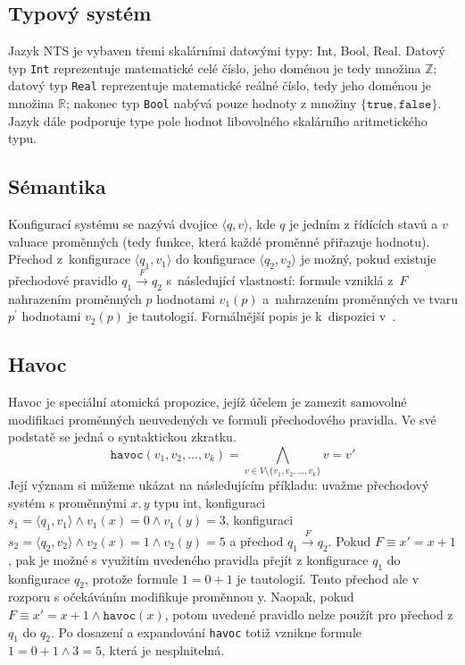 \documentclass[10pt,a4paper,notitlepage]{report}
\newcommand{\tuple}[1]{\langle #1 \rangle}
\begin{document}
\subsection{Typový systém}
Jazyk NTS je vybaven třemi skalárními datovými typy: Int, Bool, Real. Datový typ \texttt{Int} reprezentuje matematické celé číslo, jeho doménou je tedy množina $\mathbb{Z}$; datový typ \texttt{Real} reprezentuje matematické reálné číslo, tedy jeho doménou je množina $\mathbb{R}$; nakonec typ \texttt{Bool} nabývá pouze hodnoty z množiny $\{ \texttt{true}, \texttt{false} \}$. Jazyk dále podporuje type pole hodnot libovolného skalárního aritmetického typu.

\subsection{Sémantika}
\label{subsec:nts-configuration}
Konfigurací systému se nazývá dvojice $\tuple{q, v}$, kde $q$ je jedním z řídících stavů a $v$ valuace proměnných (tedy funkce, která každé proměnné přiřazuje hodnotu). Přechod z~konfigurace $\tuple{q_1, v_1}$ do konfigurace $\tuple{q_2, v_2}$ je možný, pokud existuje přechodové pravidlo $q_1 \overset{F}{\rightarrow} q_2$ s~následující vlastností: formule vzniklá z~$F$ nahrazením proměnných $p$ hodnotami $v_1(p)$ a~nahrazením proměnných ve tvaru $p^\prime$ hodnotami $v_2(p)$ je tautologií. Formálnější popis je k~dispozici v~\cite{NTSref}.

\subsection{Havoc}
\label{subsec:nts-havoc}
Havoc je speciální atomická propozice, jejíž účelem je zamezit samovolné modifikaci proměnných neuvedených ve formuli přechodového pravidla. Ve své podstatě se jedná o syntaktickou zkratku.
\begin{equation}
\texttt{havoc} \left( v_1, v_2, \ldots, v_k \right) = \bigwedge_{v \in V \setminus \{ v_1, v_2, \ldots, v_k \}} v = v\prime
\end{equation}
Její význam si můžeme ukázat na následujícím příkladu: uvažme přechodový systém s proměnnými $x,y$ typu int, konfiguraci $s_1 = \tuple{q_1, v_1} \land v_1(x) = 0 \land v_1(y) = 3$, konfiguraci $s_2 = \tuple{q_2, v_2} \land v_2(x) = 1 \land v_2(y) = 5$ a přechod $q_1 \overset{F}{\rightarrow} q_2$. Pokud $F \equiv x' = x + 1$, pak je možné s využitím uvedeného pravidla přejít z konfigurace $q_1$ do konfigurace $q_2$, protože formule $1 = 0 + 1$ je tautologií. Tento přechod ale v rozporu s očekáváním modifikuje proměnnou y. Naopak, pokud $F \equiv x' = x + 1 \land \texttt{havoc}(x)$, potom uvedené pravidlo nelze použít pro přechod z $q_1$ do $q_2$. Po dosazení a expandování \texttt{havoc} totiž vznikne formule $1 = 0 + 1 \land 3 = 5$, která je nesplnitelná.
\end{document}
